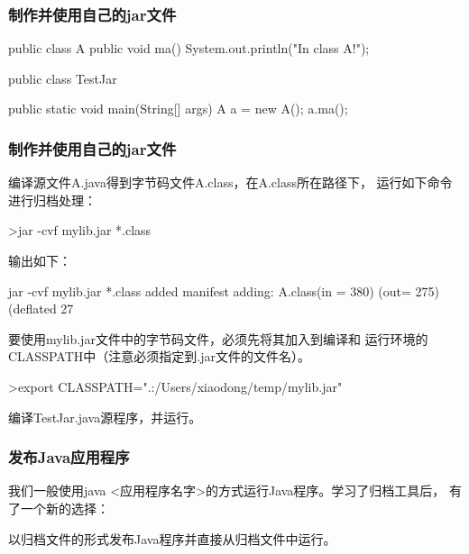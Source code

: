 \begin{frame}[fragile] %
  \frametitle{制作并使用自己的jar文件}

  
  \begin{javaCode}
    public class A {
      public void ma() {
        System.out.println("In class A!");
      }
    }  
  \end{javaCode}

  
  \begin{javaCode}
    public class TestJar {

      public static void main(String[] args) {
        A a = new A();
        a.ma();
      }
    }
  \end{javaCode}
\end{frame}

\begin{frame}[fragile] %
  \frametitle{制作并使用自己的jar文件}

   编译源文件A.java得到字节码文件A.class，在A.class所在路径下，
  运行如下命令进行归档处理：

  \begin{shCode}
    >jar -cvf mylib.jar *.class  
  \end{shCode}

  输出如下：

  \begin{stdoutCode}
    jar -cvf mylib.jar *.class
    added manifest
    adding: A.class(in = 380) (out= 275)(deflated 27%
  \end{stdoutCode}

   要使用mylib.jar文件中的字节码文件，必须先将其加入到编译和
  运行环境的CLASSPATH中（注意必须指定到.jar文件的文件名）。

  \begin{shCode}
    >export CLASSPATH=".:/Users/xiaodong/temp/mylib.jar"
  \end{shCode}

   编译TestJar.java源程序，并运行。
\end{frame}

\begin{frame}[fragile] %
  \frametitle{发布Java应用程序}

  我们一般使用java <应用程序名字>的方式运行Java程序。学习了归档工具后，
  有了一个新的选择：

  {\Blue\hei 以归档文件的形式发布Java程序并直接从归档文件中运行。}
  
\end{frame}

